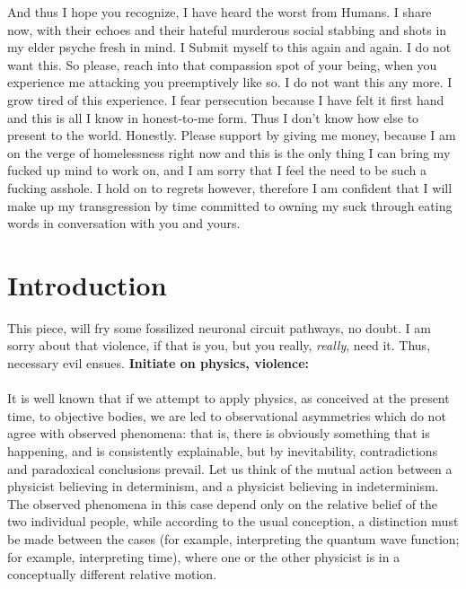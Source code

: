 \documentclass{article}
\begin{document}
And thus I hope you recognize, I have heard the worst from Humans. I share now, with their echoes and their hateful murderous social stabbing and shots in my elder psyche fresh in mind. I Submit myself to this again and again. I do not want this. So please, reach into that compassion spot of your being, when you experience me attacking you preemptively like so. I do not want this any more. I grow tired of this experience. I fear persecution because I have felt it first hand and this is all I know in honest-to-me form. Thus I don't know how else to present to the world. Honestly. Please support by giving me money, because I am on the verge of homelessness right now and this is the only thing I can bring my fucked up mind to work on, and I am sorry that I feel the need to be such a fucking asshole. I hold on to regrets however, therefore I am confident that I will make up my transgression by time committed to owning my suck through eating words in conversation with you and yours.
 
\section*{Introduction}
This piece, will fry some fossilized neuronal circuit pathways, no doubt. I am sorry about that violence, if that is you, but you really, {\em really}, need it. Thus, necessary evil ensues. {\bf Initiate on physics, violence:}\\

\\

\noindent It is well known that if we attempt to apply physics, as conceived at the present time, to objective bodies, we are led to observational asymmetries which do not agree with observed phenomena: that is, there is obviously something that is happening, and is consistently explainable, but by inevitability, contradictions and paradoxical conclusions prevail. Let us think of the mutual action between a physicist believing in determinism, and a physicist believing in indeterminism. The observed phenomena in this case depend only on the relative belief of the two individual people, while according to the usual conception, a distinction must be made between the cases (for example, interpreting the quantum wave function; for example, interpreting time), where one or the other physicist is in a conceptually different relative motion.
\end{document}
